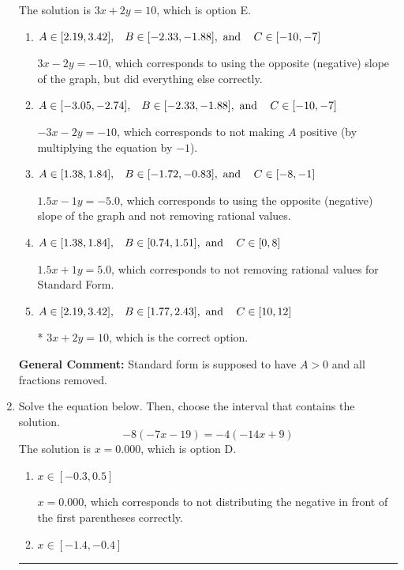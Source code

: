\documentclass{extbook}[14pt]
\newcommand{\litem}[1]{\item #1

\rule{\textwidth}{0.4pt}}
\begin{document}
\begin{enumerate}
{The solution is \( 3x + 2y = 10 \), which is option E.\begin{enumerate}[label=\Alph*.]
\item \( A \in [2.19, 3.42], \hspace{3mm} B \in [-2.33, -1.88], \text{ and } \hspace{3mm} C \in [-10, -7] \)

 $3x - 2y = -10$, which corresponds to using the opposite (negative) slope of the graph, but did everything else correctly.
\item \( A \in [-3.05, -2.74], \hspace{3mm} B \in [-2.33, -1.88], \text{ and } \hspace{3mm} C \in [-10, -7] \)

 $-3x - 2y = -10$, which corresponds to not making $A$ positive (by multiplying the equation by $-1$).
\item \( A \in [1.38, 1.84], \hspace{3mm} B \in [-1.72, -0.83], \text{ and } \hspace{3mm} C \in [-8, -1] \)

 $1.5x - 1y = -5.0$, which corresponds to using the opposite (negative) slope of the graph and not removing rational values.
\item \( A \in [1.38, 1.84], \hspace{3mm} B \in [0.74, 1.51], \text{ and } \hspace{3mm} C \in [0, 8] \)

 $1.5x + 1y = 5.0$, which corresponds to not removing rational values for Standard Form.
\item \( A \in [2.19, 3.42], \hspace{3mm} B \in [1.77, 2.43], \text{ and } \hspace{3mm} C \in [10, 12] \)

* $3x + 2y = 10$, which is the correct option.
\end{enumerate}

\textbf{General Comment:} Standard form is supposed to have $A > 0$ and all fractions removed.
}
\litem{
Solve the equation below. Then, choose the interval that contains the solution.
\[ -8(-7x -19) = -4(-14x + 9) \]The solution is \( x = 0.000 \), which is option D.\begin{enumerate}[label=\Alph*.]
\item \( x \in [-0.3, 0.5] \)

$x = 0.000$, which corresponds to not distributing the negative in front of the first parentheses correctly.
\item \( x \in [-1.4, -0.4] \)


\end{enumerate}}
\end{enumerate}
\end{document}
